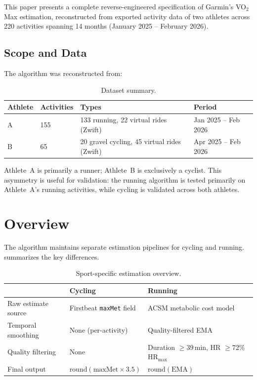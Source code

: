 \documentclass[11pt,a4paper]{article}
\begin{document}
This paper presents a complete reverse-engineered specification of Garmin's VO$_2$Max estimation, reconstructed from exported activity data of two athletes across 220 activities spanning 14 months (January 2025 -- February 2026).

\subsection{Scope and Data}

The algorithm was reconstructed from:

\begin{table}[H]
\centering
\caption{Dataset summary.}
\label{tab:dataset}
\begin{tabular}{@{}llll@{}}
\toprule
\textbf{Athlete} & \textbf{Activities} & \textbf{Types} & \textbf{Period} \\
\midrule
A & 155 & 133 running, 22 virtual rides (Zwift) & Jan 2025 -- Feb 2026 \\
B & 65  & 20 gravel cycling, 45 virtual rides (Zwift) & Apr 2025 -- Feb 2026 \\
\bottomrule
\end{tabular}
\end{table}

Athlete~A is primarily a runner; Athlete~B is exclusively a cyclist.
This asymmetry is useful for validation: the running algorithm is tested primarily on Athlete~A's running activities, while cycling is validated across both athletes.


\section{Overview}
\label{sec:overview}

The algorithm maintains separate estimation pipelines for cycling and running.
 summarizes the key differences.

\begin{table}[H]
\centering
\caption{Sport-specific estimation overview.}
\label{tab:overview}
\begin{tabular}{@{}lll@{}}
\toprule
 & \textbf{Cycling} & \textbf{Running} \\
\midrule
Raw estimate source & Firstbeat \texttt{maxMet} field & ACSM metabolic cost model \\
Temporal smoothing & None (per-activity) & Quality-filtered EMA \\
Quality filtering & None & Duration $\geq 39$\,min, HR $\geq 72$\% HR$_{\text{max}}$ \\
Final output & $\text{round}(\text{maxMet} \times 3.5)$ & $\text{round}(\text{EMA})$ \\
\bottomrule
\end{tabular}
\end{table}
\end{document}
